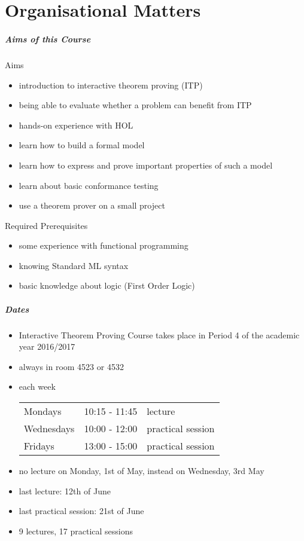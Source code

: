 \part{Organisational Matters}

\frame[plain]{\partpage}


\begin{frame}
\frametitle{Aims of this Course}

\begin{block}{Aims}
\begin{itemize}
\item introduction to interactive theorem proving (ITP)
\item being able to evaluate whether a problem can benefit from ITP
\item hands-on experience with HOL
\item learn how to build a formal model
\item learn how to express and prove important properties of such a model
\item learn about basic conformance testing
\item use a theorem prover on a small project
\end{itemize}
\end{block}

\begin{block}{Required Prerequisites}
\begin{itemize}
\item some experience with functional programming
\item knowing Standard ML syntax
\item basic knowledge about logic (\eg First Order Logic)
\end{itemize}
\end{block}

\end{frame}


\begin{frame}
\frametitle{Dates}

\begin{itemize}
\item Interactive Theorem Proving Course takes place in Period 4 of the academic year 2016/2017
\item always in room 4523 or 4532
\item each week\\\medskip\qquad
\begin{tabular}{lll}
Mondays & 10:15 - 11:45 & lecture \\
Wednesdays & 10:00 - 12:00 & practical session \\
Fridays & 13:00 - 15:00 & practical session
\end{tabular}
\item no lecture on Monday, 1st of May, instead on Wednesday, 3rd May
\item last lecture: 12th of June
\item last practical session: 21st of June
\item 9 lectures, 17 practical sessions
\end{itemize}
\end{frame}



